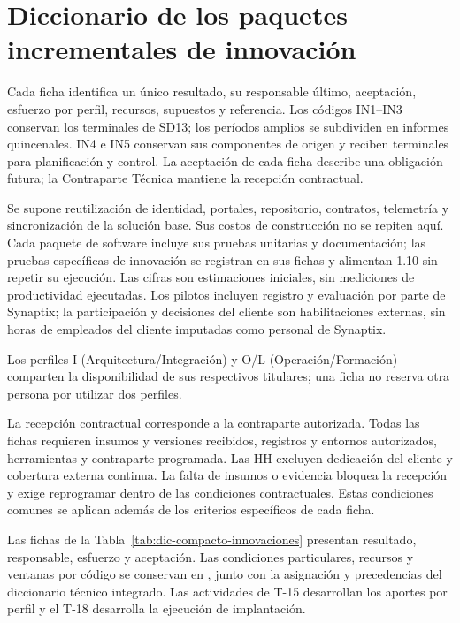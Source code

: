 \section{Diccionario de los paquetes incrementales de innovación}
Cada ficha identifica un único resultado, su responsable último, aceptación, esfuerzo por perfil, recursos, supuestos y referencia. Los códigos IN1--IN3 conservan los terminales de SD13; los períodos amplios se subdividen en informes quincenales. IN4 e IN5 conservan sus componentes de origen y reciben terminales para planificación y control. La aceptación de cada ficha describe una obligación futura; la Contraparte Técnica mantiene la recepción contractual.

Se supone reutilización de identidad, portales, repositorio, contratos, telemetría y sincronización de la solución base. Sus costos de construcción no se repiten aquí. Cada paquete de software incluye sus pruebas unitarias y documentación; las pruebas específicas de innovación se registran en sus fichas y alimentan 1.10 sin repetir su ejecución. Las cifras son estimaciones iniciales, sin mediciones de productividad ejecutadas. Los pilotos incluyen registro y evaluación por parte de Synaptix; la participación y decisiones del cliente son habilitaciones externas, sin horas de empleados del cliente imputadas como personal de Synaptix.

Los perfiles I (Arquitectura/Integración) y O/L (Operación/Formación) comparten la disponibilidad de sus respectivos titulares; una ficha no reserva otra persona por utilizar dos perfiles.

La recepción contractual corresponde a la contraparte autorizada. Todas las fichas requieren insumos y versiones recibidos, registros y entornos autorizados, herramientas y contraparte programada. Las HH excluyen dedicación del cliente y cobertura externa continua. La falta de insumos o evidencia bloquea la recepción y exige reprogramar dentro de las condiciones contractuales. Estas condiciones comunes se aplican además de los criterios específicos de cada ficha.

Las fichas de la Tabla~\ref{tab:dic-compacto-innovaciones} presentan resultado, responsable, esfuerzo y aceptación. Las condiciones particulares, recursos y ventanas por código se conservan en , junto con la asignación y precedencias del diccionario técnico integrado. Las actividades de T-15 desarrollan los aportes por perfil y el T-18 desarrolla la ejecución de implantación.


